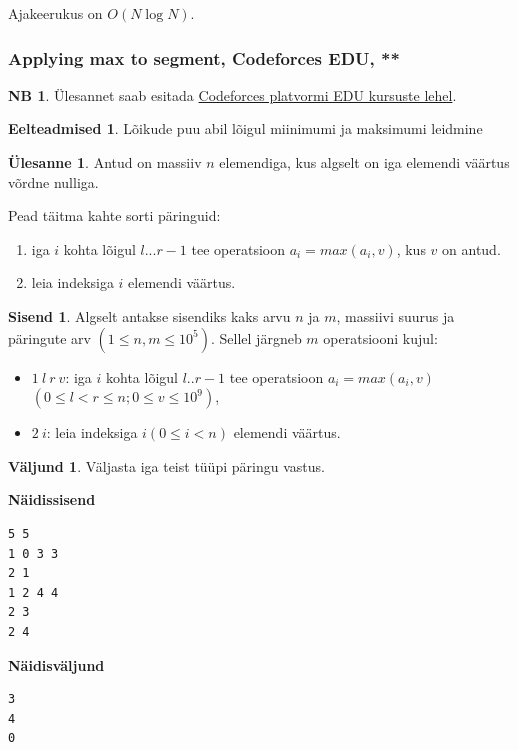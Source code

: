 \documentclass{trkut}
\theoremstyle{definition}
\newtheorem*{prereq}{Eelteadmised}
\newtheorem*{extra}{NB}
\newtheorem*{Input}{Sisend}
\newtheorem*{Output}{Väljund}
\newtheorem*{Text}{Ülesanne}
\begin{document}
Ajakeerukus on $O(N\log N)$.


\subsubsection{Applying max to segment, Codeforces EDU, **}
\begin{extra}
Ülesannet saab esitada \href{https://codeforces.com/edu/course/2/lesson/5/1/practice/contest/279634/problem/B}{Codeforces platvormi EDU kursuste lehel}.
\end{extra}
\begin{prereq}
Lõikude puu abil lõigul miinimumi ja maksimumi leidmine
\end{prereq}

\begin{Text}
Antud on massiiv $n$ elemendiga, kus algselt on iga elemendi väärtus võrdne nulliga.

Pead täitma kahte sorti päringuid:
\begin{enumerate}
\item iga $i$ kohta lõigul $l...r-1$ tee operatsioon $a_i=max(a_i, v)$, kus $v$ on antud.
\item leia indeksiga $i$ elemendi väärtus.
\end{enumerate}

\parencite{inseg}
\end{Text}
\begin{Input}
Algselt antakse sisendiks kaks arvu $n$ ja $m$, massiivi suurus ja päringute arv $(1\le n,m\le 10^5)$.
Sellel järgneb $m$ operatsiooni kujul:
\begin{itemize}
\item $1\ l\ r\ v$: iga $i$ kohta lõigul $l..r-1$ tee operatsioon $a_i=max(a_i,v)$$(0\le l<r\le n; 0\le v\le 10^9)$,
\item $2\ i$: leia indeksiga $i$$(0\le i<n)$ elemendi väärtus.
\end{itemize}

\end{Input}
\begin{Output}
Väljasta iga teist tüüpi päringu vastus.
\end{Output}

\textbf{Näidissisend}

\begin{verbatim}
5 5
1 0 3 3
2 1
1 2 4 4
2 3
2 4
\end{verbatim}

\textbf{Näidisväljund}

\begin{verbatim}
3
4
0
\end{verbatim}
\end{document}
